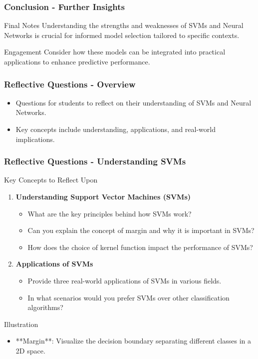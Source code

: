 \documentclass[aspectratio=169]{beamer}
\begin{document}
\begin{frame}[fragile]
    \frametitle{Conclusion - Further Insights}
    \begin{block}{Final Notes}
        Understanding the strengths and weaknesses of SVMs and Neural Networks is crucial for informed model selection tailored to specific contexts.
    \end{block}
    \begin{block}{Engagement}
        Consider how these models can be integrated into practical applications to enhance predictive performance.
    \end{block}
\end{frame}

\begin{frame}[fragile]
    \frametitle{Reflective Questions - Overview}
    \begin{itemize}
        \item Questions for students to reflect on their understanding of SVMs and Neural Networks.
        \item Key concepts include understanding, applications, and real-world implications.
    \end{itemize}
\end{frame}

\begin{frame}[fragile]
    \frametitle{Reflective Questions - Understanding SVMs}
    \begin{block}{Key Concepts to Reflect Upon}
        \begin{enumerate}
            \item \textbf{Understanding Support Vector Machines (SVMs)}
            \begin{itemize}
                \item What are the key principles behind how SVMs work?
                \item Can you explain the concept of margin and why it is important in SVMs?
                \item How does the choice of kernel function impact the performance of SVMs?
            \end{itemize}
            \item \textbf{Applications of SVMs}
            \begin{itemize}
                \item Provide three real-world applications of SVMs in various fields.
                \item In what scenarios would you prefer SVMs over other classification algorithms?
            \end{itemize}
        \end{enumerate}
    \end{block}
    \begin{block}{Illustration}
        \begin{itemize}
            \item **Margin**: Visualize the decision boundary separating different classes in a 2D space.
        \end{itemize}
    \end{block}
\end{frame}
\end{document}
